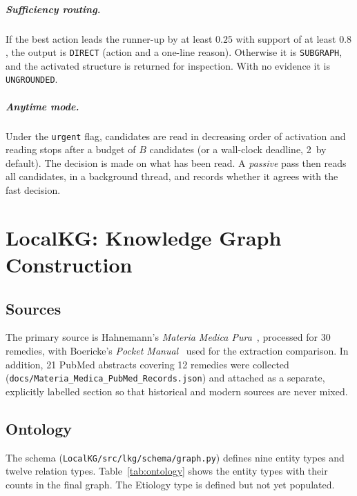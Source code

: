 \documentclass[12pt,a4paper,oneside]{report}
\newcommand{\code}[1]{\texttt{\small #1}}
\newcommand{\ms}{\,\text{ms}}
\begin{document}
\paragraph{Sufficiency routing.} If the best action leads the runner-up by at least $0.25$ with support of at least $0.8$, the output is \code{DIRECT} (action and a one-line reason). Otherwise it is \code{SUBGRAPH}, and the activated structure is returned for inspection. With no evidence it is \code{UNGROUNDED}.

\paragraph{Anytime mode.} Under the \code{urgent} flag, candidates are read in decreasing order of activation and reading stops after a budget of $B$ candidates (or a wall-clock deadline, 2\ms{} by default). The decision is made on what has been read. A \emph{passive} pass then reads all candidates, in a background thread, and records whether it agrees with the fast decision.

\chapter{LocalKG: Knowledge Graph Construction}\label{ch:kg}
\section{Sources}
The primary source is Hahnemann's \emph{Materia Medica Pura}~\cite{hahnemann1880}, processed for 30 remedies, with Boericke's \emph{Pocket Manual}~\cite{boericke1927} used for the extraction comparison. In addition, 21 PubMed abstracts covering 12 remedies were collected (\code{docs/Materia\_Medica\_PubMed\_Records.json}) and attached as a separate, explicitly labelled section so that historical and modern sources are never mixed.

\section{Ontology}
The schema (\code{LocalKG/src/lkg/schema/graph.py}) defines nine entity types and twelve relation types. Table~\ref{tab:ontology} shows the entity types with their counts in the final graph. The Etiology type is defined but not yet populated.
\end{document}
